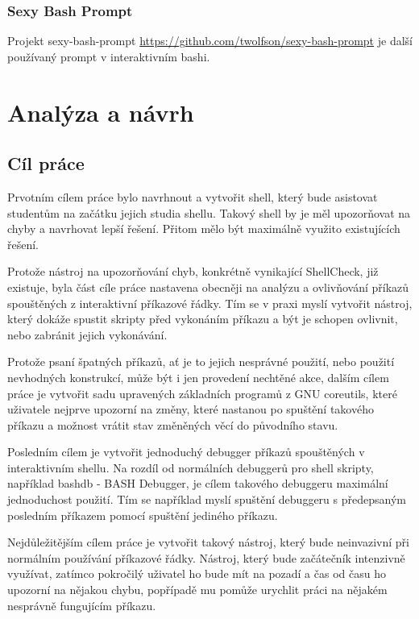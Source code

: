 \documentclass[thesis=M,czech]{FITthesis}[2012/06/26]
\begin{document}
\subsection{Sexy Bash Prompt}

Projekt sexy-bash-prompt \url{https://github.com/twolfson/sexy-bash-prompt} je další používaný prompt v interaktivním bashi.



%
%
%
\chapter{Analýza a návrh}

%
%
%
\section{Cíl práce}

Prvotním cílem práce bylo navrhnout a vytvořit shell, který bude asistovat studentům na začátku jejich studia shellu. Takový shell by je měl upozorňovat na chyby a navrhovat lepší řešení. Přitom mělo být maximálně využito existujících řešení.

Protože nástroj na upozorňování chyb, konkrétně vynikající ShellCheck, již existuje, byla část cíle práce nastavena obecněji na analýzu a ovlivňování příkazů spouštěných z interaktivní příkazové řádky. Tím se v praxi myslí vytvořit nástroj, který dokáže spustit skripty před vykonáním příkazu a být je schopen ovlivnit, nebo zabránit jejich vykonávání.

Protože psaní špatných příkazů, ať je to jejich nesprávné použití, nebo použití nevhodných konstrukcí, může být i jen provedení nechtěné akce, dalším cílem práce je vytvořit sadu upravených základních programů z GNU coreutils, které uživatele nejprve upozorní na změny, které nastanou po spuštění takového příkazu a možnost vrátit stav změněných věcí do původního stavu.

Posledním cílem je vytvořit jednoduchý debugger příkazů spouštěných v interaktivním shellu. Na rozdíl od normálních debuggerů pro shell skripty, například bashdb - BASH Debugger, je cílem takového debuggeru maximální jednoduchost použití. Tím se například myslí spuštění debuggeru s předepsaným posledním příkazem pomocí spuštění jediného příkazu.

Nejdůležitějším cílem práce je vytvořit takový nástroj, který bude neinvazivní při normálním používání příkazové řádky. Nástroj, který bude začátečník intenzivně využívat, zatímco pokročilý uživatel ho bude mít na pozadí a čas od času ho upozorní na nějakou chybu, popřípadě mu pomůže urychlit práci na nějakém nesprávně fungujícím příkazu.
\end{document}
